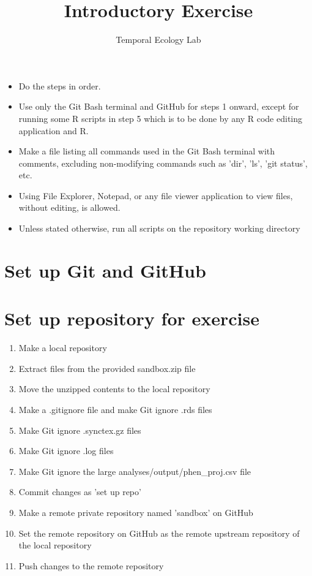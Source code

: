 \documentclass[11pt]{article}
\begin{document}
% 

\title{Introductory Exercise}
\author{Temporal Ecology Lab}
\maketitle

\begin{itemize}
  \item Do the steps in order.
  \item Use only the Git Bash terminal and GitHub for steps 1 onward, except for running some R scripts in step 5 which is to be done by any R code editing application and R.
  \item Make a file listing all commands used in the Git Bash terminal with comments, excluding non-modifying commands such as 'dir', 'ls', 'git status', etc.
  \item Using File Explorer, Notepad, or any file viewer application to view files, without editing, is allowed.
  \item Unless stated otherwise, run all scripts on the repository working directory
\end{itemize}

\section{Set up Git and GitHub}

\section{Set up repository for exercise}
\begin{enumerate}
  \item Make a local repository
  \item Extract files from the provided sandbox.zip file
  \item Move the unzipped contents to the local repository
  \item Make a .gitignore file and make Git ignore .rds files 
  \item Make Git ignore .synctex.gz files
  \item Make Git ignore .log files
  \item Make Git ignore the large analyses/output/phen\_proj.csv file
  \item Commit changes as 'set up repo'
  \item Make a remote private repository named 'sandbox' on GitHub
  \item Set the remote repository on GitHub as the remote upstream repository of the local repository
  \item Push changes to the remote repository
\end{enumerate}
\end{document}
